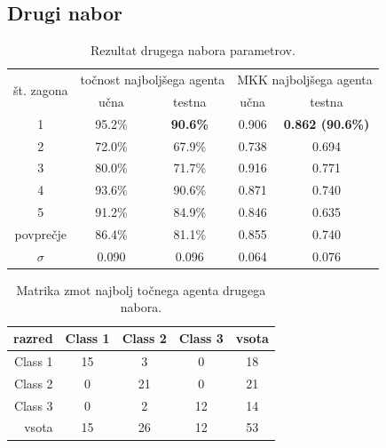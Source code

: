 \subsection{Drugi nabor}\label{subsec:dodatek-wine-drugi-nabor}
\begin{table}[H]
    \begin{center}
        \begin{tabular}{|| c | c c || c c ||}
            \hline
            \multirow{2}{*}{št. zagona} & \multicolumn{2}{c||}{točnost najboljšega agenta} & \multicolumn{2}{c||}{MKK najboljšega agenta} \\ \cline{2-5}
            & učna   & testna          & učna  & testna                  \\
            \hline
            1         & 95.2\% & \textbf{90.6\%} & 0.906 & \textbf{0.862 (90.6\%)} \\
            \hline
            2         & 72.0\% & 67.9\%          & 0.738 & 0.694                   \\
            \hline
            3         & 80.0\% & 71.7\%          & 0.916 & 0.771                   \\
            \hline
            4         & 93.6\% & 90.6\%          & 0.871 & 0.740                   \\
            \hline
            5         & 91.2\% & 84.9\%          & 0.846 & 0.635                   \\
            \hline
            povprečje & 86.4\% & 81.1\%          & 0.855 & 0.740                   \\
            \hline
            $\sigma$  & 0.090  & 0.096           & 0.064 & 0.076                   \\
            \hline
        \end{tabular}
    \end{center}
    \caption{Rezultat drugega nabora parametrov.}
    \label{tab:wine_result_2}
\end{table}

\begin{table}[H]
    \centering
    \begin{tabular}{||rcccc||}
        \hline
        razred  & Class 1 & Class 2 & Class 3 & vsota \\ \hline
        Class 1 & 15      & 3       & 0       & 18    \\ \hline
        Class 2 & 0       & 21      & 0       & 21    \\ \hline
        Class 3 & 0       & 2       & 12      & 14    \\ \hline
        vsota   & 15      & 26      & 12      & 53    \\ \hline
    \end{tabular}
    \caption{Matrika zmot najbolj točnega agenta drugega nabora.}
    \label{tab:wine_acc_2}
\end{table}


